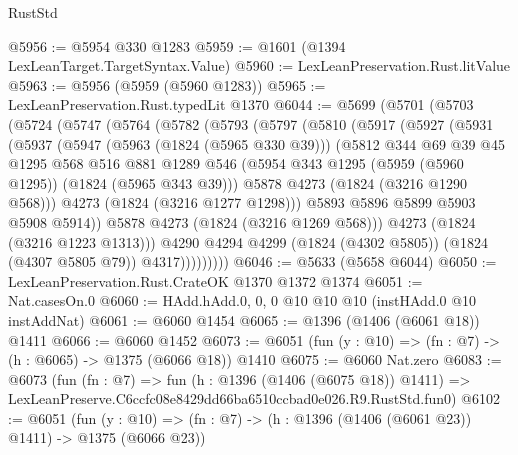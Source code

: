 \begin{lexlean}{RustStd}
\begin{coremodule}
@5956 := @5954 @330 @1283
@5959 := @1601 (@1394 LexLeanTarget.TargetSyntax.Value)
@5960 := LexLeanPreservation.Rust.litValue
@5963 := @5956 (@5959 (@5960 @1283))
@5965 := LexLeanPreservation.Rust.typedLit @1370
@6044 := @5699
    (@5701
      (@5703
        (@5724
          (@5747
            (@5764
              (@5782
                (@5793
                  (@5797
                    (@5810
                      (@5917
                        (@5927
                          (@5931
                            (@5937
                              (@5947
                                (@5963 (@1824 (@5965 @330 @39)))
                                (@5812
                                  @344
                                  @69
                                  @39
                                  @45
                                  @1295
                                  @568
                                  @516
                                  @881
                                  @1289
                                  @546
                                  (@5954 @343 @1295 (@5959 (@5960 @1295)) (@1824 (@5965 @343 @39)))
                                  @5878
                                  @4273
                                  (@1824 (@3216 @1290 @568)))
                                @4273
                                (@1824 (@3216 @1277 @1298)))
                              @5893
                              @5896
                              @5899
                              @5903
                              @5908
                              @5914))
                          @5878
                          @4273
                          (@1824 (@3216 @1269 @568)))
                        @4273
                        (@1824 (@3216 @1223 @1313)))
                      @4290
                      @4294
                      @4299
                      (@1824 (@4302 @5805))
                      (@1824 (@4307 @5805 @79))
                      @4317)))))))))
@6046 := @5633 (@5658 @6044)
@6050 := LexLeanPreservation.Rust.CrateOK @1370 @1372 @1374
@6051 := Nat.casesOn.{0}
@6060 := HAdd.hAdd.{0, 0, 0} @10 @10 @10 (instHAdd.{0} @10 instAddNat)
@6061 := @6060 @1454
@6065 := @1396 (@1406 (@6061 @18)) @1411
@6066 := @6060 @1452
@6073 := @6051 (fun (y : @10) => (fn : @7) -> (h : @6065) -> @1375 (@6066 @18)) @1410
@6075 := @6060 Nat.zero
@6083 := @6073
    (fun (fn : @7) =>
    fun (h : @1396 (@1406 (@6075 @18)) @1411) =>
    LexLeanPreserve.C6ccfc08e8429dd66ba6510ccbad0e026.R9.RustStd.fun0)
@6102 := @6051
    (fun (y : @10) => (fn : @7) -> (h : @1396 (@1406 (@6061 @23)) @1411) -> @1375 (@6066 @23))

\end{coremodule}
\end{lexlean}
